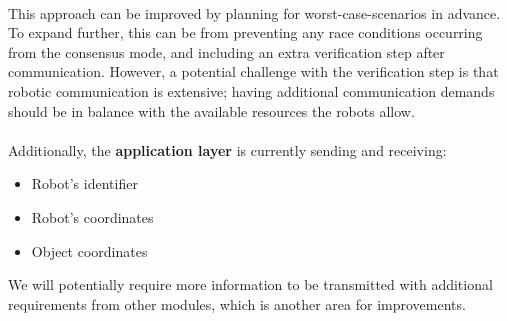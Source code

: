 \paragraph*{}
This approach can be improved by planning for worst-case-scenarios in advance. To expand further, this can be from preventing any race conditions occurring from the consensus mode, and including an extra verification step after communication. However, a potential challenge with the verification step is that robotic communication is extensive; having additional communication demands should be in balance with the available resources the robots allow.

\paragraph*{}
Additionally, the \textbf{application layer} is currently sending and receiving:

\begin{itemize}
    \item Robot's identifier
    \item Robot's coordinates
    \item Object coordinates
\end{itemize}

We will potentially require more information to be transmitted with additional requirements from other modules, which is another area for improvements.
